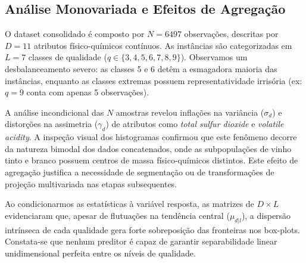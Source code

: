 
\subsection{Análise Monovariada e Efeitos de Agregação}
O dataset consolidado é composto por $N=6497$ observações, descritas por $D=11$ atributos físico-químicos contínuos. As instâncias são categorizadas em $L=7$ classes de qualidade ($q \in \{3, 4, 5, 6, 7, 8, 9\}$). Observamos um desbalanceamento severo: as classes 5 e 6 detêm a esmagadora maioria das instâncias, enquanto as classes extremas possuem representatividade irrisória (ex: $q=9$ conta com apenas 5 observações). 

A análise incondicional das $N$ amostras revelou inflações na variância ($\sigma_d$) e distorções na assimetria ($\gamma_d$) de atributos como \textit{total sulfur dioxide} e \textit{volatile acidity}. A inspeção visual dos histogramas confirmou que este fenômeno decorre da natureza bimodal dos dados concatenados, onde as subpopulações de vinho tinto e branco possuem centros de massa físico-químicos distintos. Este efeito de agregação justifica a necessidade de segmentação ou de transformações de projeção multivariada nas etapas subsequentes.

Ao condicionarmos as estatísticas à variável resposta, as matrizes de $D \times L$ evidenciaram que, apesar de flutuações na tendência central ($\mu_{d|l}$), a dispersão intrínseca de cada qualidade gera forte sobreposição das fronteiras nos box-plots. Constata-se que nenhum preditor é capaz de garantir separabilidade linear unidimensional perfeita entre os níveis de qualidade.
